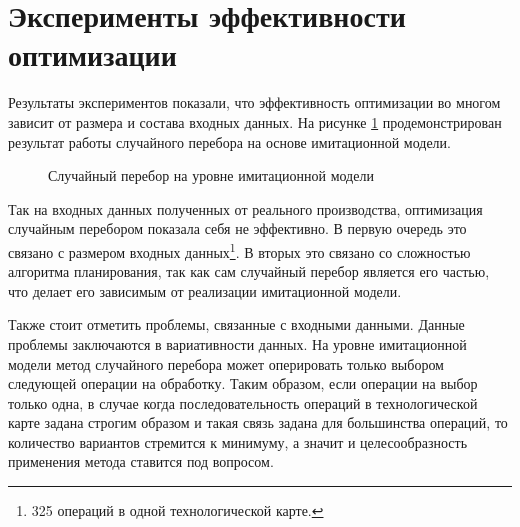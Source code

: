 \section*{Эксперименты эффективности оптимизации}
\label{experiment}
Результаты экспериментов показали, что эффективность оптимизации во многом зависит от размера и состава входных данных. На рисунке \ref{ris:Result_Random_Search} продемонстрирован результат работы случайного перебора на основе имитационной модели.

\begin{figure}[H]
    \caption{Случайный перебор на уровне имитационной модели}
    \label{ris:Result_Random_Search}
\end{figure}


Так на входных данных полученных от реального производства, оптимизация случайным перебором показала себя не эффективно. В первую очередь это связано с размером входных данных\footnote{325 операций в одной технологической карте.}. В вторых это связано со сложностью алгоритма планирования, так как сам случайный перебор является его частью, что делает его зависимым от реализации имитационной модели.

Также стоит отметить проблемы, связанные с входными данными. Данные проблемы заключаются в вариативности данных. На уровне имитационной модели метод случайного перебора может оперировать только выбором следующей операции на обработку. Таким образом, если операции на выбор только одна, в случае когда последовательность операций в технологической карте задана строгим образом и такая связь задана для большинства операций, то количество вариантов стремится к минимуму, а значит и целесообразность применения метода ставится под вопросом.


